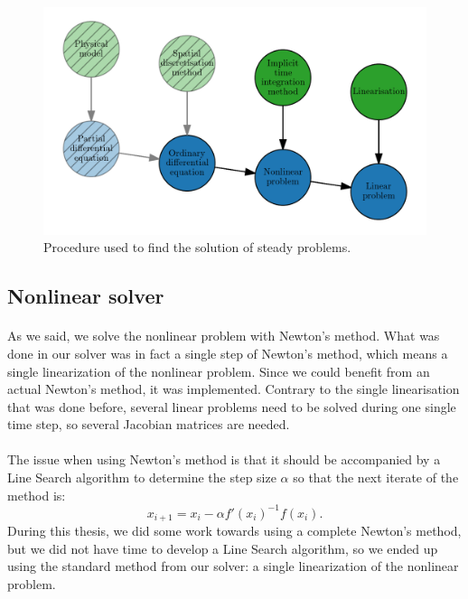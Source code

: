      \begin{figure}
        \centering
        \includegraphics{figures/steady_solve.png}
        \caption{Procedure used to find the solution of steady problems.}
        \label{fig:steady_solve}
      \end{figure}


    \subsection{Nonlinear solver}

      \paragraph{}
      As we said, we solve the nonlinear problem with Newton's method.
      What was done in our solver was in fact a single step of Newton's method, which means a single linearization of the nonlinear problem.
      Since we could benefit from an actual Newton's method, it was implemented.
      Contrary to the single linearisation that was done before, several linear problems need to be solved during one single time step, so several Jacobian matrices are needed.

      \paragraph{}
      The issue when using Newton's method is that it should be accompanied by a Line Search algorithm to determine the step size $\alpha$ so that the next iterate of the method is:
      \begin{equation}
        x_{i+1} = x_i - \alpha f'\left(x_i\right)^{-1} f\left(x_i\right) .
      \end{equation}
      During this thesis, we did some work towards using a complete Newton's method, but we did not have time to develop a Line Search algorithm, so we ended up using the standard method from our solver: a single linearization of the nonlinear problem.



